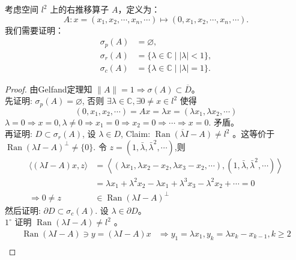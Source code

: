 \documentclass[lang=cn,newtx,10pt,scheme=chinese,thmcnt=chapter]{elegantbook}
\begin{document}
\begin{example}
考虑空间 \( l^2 \) 上的右推移算子 \( A \)，定义为：
\[
A: x = \left(x_1, x_2, \cdots, x_n, \cdots\right) \mapsto \left(0, x_1, x_2, \cdots, x_n, \cdots\right).
\]
我们需要证明：
\[
\begin{aligned}
\sigma_p(A) &= \varnothing, \\
\sigma_r(A) &= \{\lambda \in \mathbb{C} \mid |\lambda| < 1\}, \\
\sigma_c(A) &= \{\lambda \in \mathbb{C} \mid |\lambda| = 1\}.
\end{aligned}
\]

\end{example}
\begin{proof}
由Gelfand定理知 $\|A\|=1 \Rightarrow \sigma(A)\subset\overline{ D }$。\\
先证明: $\sigma_p(A)=\varnothing$, 否则 $\exists \lambda \in \mathbb{C} , \exists 0 \neq x \in l^2$ 使得
\begin{equation*}
\left(0, x_1, x_2, \cdots\right)=A x=\lambda x=\left(\lambda x_1, \lambda x_2, \cdots\right)
\end{equation*}
$\lambda=0 \Rightarrow x=0, \lambda \neq 0 \Rightarrow x_1=0 \Rightarrow x_2=0 \Rightarrow \cdots \Rightarrow x=0$. 矛盾。\\
再证明: $D \subset \sigma_r(A)$, 设 $\lambda \in D$, Claim: $\overline{\operatorname{Ran}(\lambda I-A)} \neq l^2$ 。这等价于 $\operatorname{Ran}(\lambda I-A)^{\perp} \neq\{0\}$. 令 $z=\left(1, \bar{\lambda}, \bar{\lambda}^2, \cdots\right)$,则
\begin{equation*}
\begin{aligned}
\langle(\lambda I-A) x, z\rangle & =\left\langle\left(\lambda x_1, \lambda x_2-x_2, \lambda x_3-x_2, \cdots\right),\left(1, \bar{\lambda}, \bar{\lambda}^2, \cdots\right)\right\rangle \\
& =\lambda x_1+\lambda^2 x_2-\lambda x_1+\lambda^3 x_3-\lambda^2 x_2+\cdots=0 \\
\Rightarrow 0 \neq z & \in \operatorname{Ran}(\lambda I-A)^{\perp}
\end{aligned}
\end{equation*}
然后证明: $\partial D \subset \sigma_c(A)$. 设 $\lambda \in \partial D$。 
\\$1^{\circ}$ 证明 $\operatorname{Ran}(\lambda I-A) \neq l^2$ 。
\begin{equation*}
\begin{aligned}
\operatorname{Ran}(\lambda I-A) \ni y=(\lambda I-A) x & \Rightarrow y_1=\lambda x_1, y_k=\lambda x_k-x_{k-1}, k \geqslant 2 \\

\end{aligned}
\end{equation*}
\end{proof}
\end{document}
